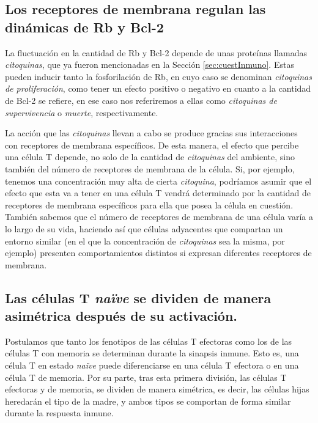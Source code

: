 \subsection{Los receptores de membrana regulan las dinámicas de Rb y Bcl-2}
\label{sub:hip_recep}

La fluctuación en la cantidad de Rb y Bcl-2 depende de unas proteínas llamadas \textit{citoquinas}, que ya fueron mencionadas en la Sección \ref{sec:cuestInmuno}. Estas pueden inducir tanto la fosforilación de Rb, en cuyo caso se denominan \textit{citoquinas de proliferación}, como tener un efecto positivo o negativo en cuanto a la cantidad de Bcl-2 se refiere, en ese caso nos referiremos a ellas como \textit{citoquinas de supervivencia} o \textit{muerte}, respectivamente.

La acción que las \textit{citoquinas} llevan a cabo se produce gracias sus interacciones con receptores de membrana específicos. De esta manera, el efecto que percibe una célula T depende, no solo de la cantidad de \textit{citoquinas} del ambiente, sino también del número de receptores de membrana de la célula. Si, por ejemplo, tenemos una concentración muy alta de cierta \textit{citoquina}, podríamos asumir que el efecto que esta va a tener en una célula T vendrá determinado por la cantidad de receptores de membrana específicos para ella que posea la célula en cuestión. También sabemos que el número de receptores de membrana de una célula varía a lo largo de su vida, haciendo así que células adyacentes que compartan un entorno similar (en el que la concentración de \textit{citoquinas} sea la misma, por ejemplo) presenten comportamientos distintos si expresan diferentes receptores de membrana.

\subsection{Las células T \textit{naïve} se dividen de manera asimétrica después de su activación.}
\label{sub:hip_divAsim}

Postulamos que tanto los fenotipos de las células T efectoras como los de las células T con memoria se determinan durante la sinapsis inmune. Esto es, una célula T en estado \textit{naïve} puede diferenciarse en una célula T efectora o en una célula T de memoria. Por su parte, tras esta primera división, las células T efectoras y de memoria, se dividen de manera simétrica, es decir, las células hijas heredarán el tipo de la madre, y ambos tipos se comportan de forma similar durante la respuesta inmune.

